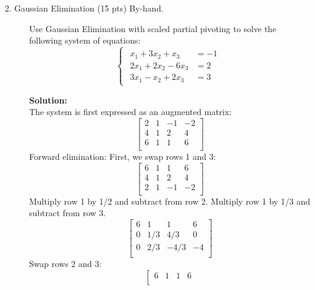 \documentclass[12pt]{article}
\begin{document}
\begin{description}
		\item[2. Gaussian Elimination (15 pts) By-hand.] Use Gaussian Elimination with scaled partial pivoting to solve the following system of equations:
		\begin{equation*}
		\begin{cases}
		\begin{aligned}
		x_1 + 3x_2 + x_3 &= -1 \\ 
		2x_1 + 2x_2 - 6x_3 &= 2 \\ 
		3x_1 - x_2 + 2x_3 &= 3
		\end{aligned}
		\end{cases}
		\end{equation*}
		
		\ifsolution
		\color{red}
		{\bf Solution:}\\
		The system is first expressed as an augmented matrix:
		\begin{equation*}
		\left[
		\begin{array}{cccc }
		2 & 1 & -1 & -2 \\
		4 & 1 &  2 &  4 \\
		6 & 1 &  1 & 6 \\
		\end{array}
		\right]
		\end{equation*}
		Forward elimination: First, we swap rows 1 and 3:
		\begin{equation*}
		\left[
		\begin{array}{cccc }
		6 & 1 &  1 & 6 \\
		4 & 1 &  2 &  4 \\
		2 & 1 &  -1 & -2 \\
		\end{array}
		\right]
		\end{equation*}
		Multiply row 1 by 1/2 and subtract from row 2. Multiply row 1 by 1/3 and subtract from row 3.
		\begin{equation*}
		\left[
		\begin{array}{cccc }
		6 & 1 &  1 & 6 \\
		0 & 1/3 &  4/3 &  0 \\
		0 & 2/3 &  -4/3 & -4 \\
		\end{array}
		\right]
		\end{equation*}
		Swap rows 2 and 3:
		\begin{equation*}
		\left[
		\begin{array}{cccc }
		6 & 1 &  1 & 6 \\

\end{array}
\end{equation*}
\end{description}
\end{document}
